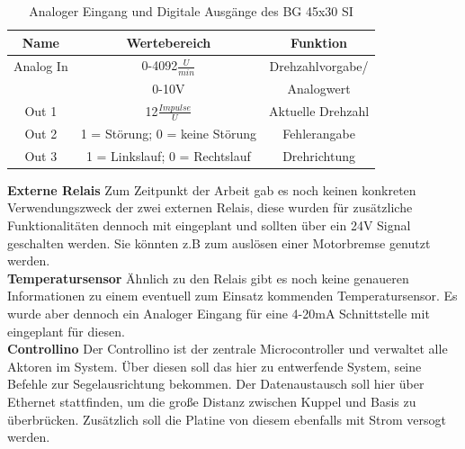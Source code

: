 \begin{table}[H]
	\centering
	\begin{tabular}{|c|c|c|}
		\hline
		\textbf{Name} & \textbf{Wertebereich} & \textbf{Funktion}      \\ \hline
		Analog In                & 0-4092$\frac{U}{min}$                        & Drehzahlvorgabe/            \\ & 0-10V & Analogwert \\ \hline		Out 1                & 12$\frac{Impulse}{U}$                        & Aktuelle Drehzahl             \\ \hline
		Out 2                & 1 = Störung; 0 = keine Störung                        &  Fehlerangabe            \\ \hline
		Out 3              & 1 = Linkslauf; 0 = Rechtslauf                       &  Drehrichtung           \\ \hline
	\end{tabular}%
	\caption{Analoger Eingang und Digitale Ausgänge des BG 45x30 SI}
	\label{tab:andere_Ausgaenge}
\end{table}

\noindent\textbf{Externe Relais}\newline
Zum Zeitpunkt der Arbeit gab es noch keinen konkreten Verwendungszweck der zwei externen Relais, diese wurden für zusätzliche Funktionalitäten dennoch mit eingeplant und sollten über ein 24V Signal geschalten werden. Sie könnten z.B zum auslösen einer Motorbremse genutzt werden.\\

\noindent\textbf{Temperatursensor}\newline
Ähnlich zu den Relais gibt es noch keine genaueren Informationen zu einem eventuell zum Einsatz kommenden Temperatursensor. Es wurde aber dennoch ein Analoger Eingang für eine 4-20mA Schnittstelle mit eingeplant für diesen.\\

\noindent\textbf{Controllino}\newline
Der Controllino ist der zentrale Microcontroller und verwaltet alle Aktoren im System. Über diesen soll das hier zu entwerfende System, seine Befehle zur Segelausrichtung bekommen. Der Datenaustausch soll hier über Ethernet stattfinden, um die große Distanz zwischen Kuppel und Basis zu überbrücken. Zusätzlich soll die Platine von diesem ebenfalls mit Strom versogt werden.

